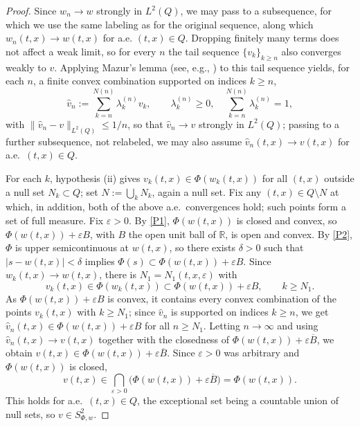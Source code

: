 \documentclass[11pt]{elsarticle}
\theoremstyle{definition}
\theoremstyle{remark}
\numberwithin{equation}{section}
\begin{document}
\begin{proof}
	Since $w_n\to w$ strongly in $L^2(Q)$, we may pass to a subsequence,
	for which we use the same labeling as for the original sequence,
	along which $w_n(t,x)\to w(t,x)$ for a.e.
	$(t,x)\in Q$. Dropping finitely many terms does not affect a weak
	limit, so for every $n$ the tail sequence $\{v_k\}_{k\ge n}$ also
	converges weakly to $v$. Applying Mazur's lemma (see, e.g.,
	\cite[Corollary~3.8]{brezis_2011}) to this tail sequence yields, for
	each $n$, a finite convex combination supported on indices $k\ge n$,
	\[
	\hat v_n := \sum_{k=n}^{N(n)} \lambda_k^{(n)} v_k,
	\qquad
	\lambda_k^{(n)}\ge0,
	\quad
	\sum_{k=n}^{N(n)}\lambda_k^{(n)}=1,
	\]
	with $\|\hat v_n-v\|_{L^2(Q)}\le 1/n$, so that $\hat v_n\to v$
	strongly in $L^2(Q)$; passing to a further subsequence, not
	relabeled, we may also assume $\hat v_n(t,x)\to v(t,x)$ for a.e.\
	$(t,x)\in Q$.
	
	For each $k$, hypothesis \textup{(ii)} gives
	$v_k(t,x)\in\Phi(w_k(t,x))$ for all $(t,x)$ outside a null set
	$N_k\subset Q$; set $N:=\bigcup_k N_k$, again a null set. Fix any
	$(t,x)\in Q\setminus N$ at which, in addition, both of the above
	a.e.\ convergences hold; such points form a set of full measure. Fix
	$\varepsilon>0$. By \ref{P1}, $\Phi(w(t,x))$ is closed and
	convex, so $\Phi(w(t,x))+\varepsilon B$, with $B$ the open unit ball
	of $\mathbb{R}$, is open and convex. By \ref{P2}, $\Phi$ is
	upper semicontinuous at $w(t,x)$, so there exists $\delta>0$ such
	that $|s-w(t,x)|<\delta$ implies
	$\Phi(s)\subset\Phi(w(t,x))+\varepsilon B$. Since
	$w_k(t,x)\to w(t,x)$, there is $N_1=N_1(t,x,\varepsilon)$ with
	\[
	v_k(t,x)\in\Phi(w_k(t,x))\subset\Phi(w(t,x))+\varepsilon B,
	\qquad k\ge N_1.
	\]
	As $\Phi(w(t,x))+\varepsilon B$ is convex, it contains every convex
	combination of the points $v_k(t,x)$ with $k\ge N_1$; since
	$\hat v_n$ is supported on indices $k\ge n$, we get
	$\hat v_n(t,x)\in\Phi(w(t,x))+\varepsilon B$ for all $n\ge N_1$.
	Letting $n\to\infty$ and using $\hat v_n(t,x)\to v(t,x)$ together
	with the closedness of $\Phi(w(t,x))+\varepsilon\overline{B}$, we
	obtain $v(t,x)\in\Phi(w(t,x))+\varepsilon\overline{B}$. Since
	$\varepsilon>0$ was arbitrary and $\Phi(w(t,x))$ is closed,
	\[
	v(t,x)\in\bigcap_{\varepsilon>0}
	\bigl(\Phi(w(t,x))+\varepsilon\overline{B}\bigr)
	=\Phi(w(t,x)).
	\]
	This holds for a.e.\ $(t,x)\in Q$, the exceptional set being a
	countable union of null sets, so $v\in S^2_{\Phi,w}$.
\end{proof}
\end{document}
